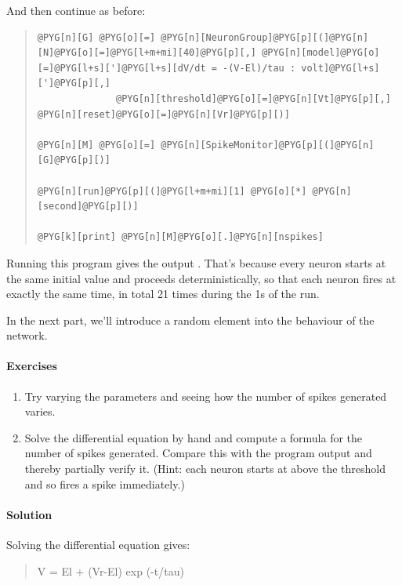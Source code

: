 \documentclass[letterpaper,10pt,english]{manual}
\begin{document}
And then continue as before:
\begin{quote}

\begin{Verbatim}[commandchars=@\[\]]
@PYG[n][G] @PYG[o][=] @PYG[n][NeuronGroup]@PYG[p][(]@PYG[n][N]@PYG[o][=]@PYG[l+m+mi][40]@PYG[p][,] @PYG[n][model]@PYG[o][=]@PYG[l+s][']@PYG[l+s][dV/dt = -(V-El)/tau : volt]@PYG[l+s][']@PYG[p][,]
              @PYG[n][threshold]@PYG[o][=]@PYG[n][Vt]@PYG[p][,] @PYG[n][reset]@PYG[o][=]@PYG[n][Vr]@PYG[p][)]

@PYG[n][M] @PYG[o][=] @PYG[n][SpikeMonitor]@PYG[p][(]@PYG[n][G]@PYG[p][)]

@PYG[n][run]@PYG[p][(]@PYG[l+m+mi][1] @PYG[o][*] @PYG[n][second]@PYG[p][)]

@PYG[k][print] @PYG[n][M]@PYG[o][.]@PYG[n][nspikes]
\end{Verbatim}
\end{quote}

Running this program gives the output . That's because
every neuron starts at the same initial value and proceeds
deterministically, so that each neuron fires at exactly the
same time, in total 21 times during the 1s of the run.

In the next part, we'll introduce a random element into the
behaviour of the network.


\paragraph{Exercises}
\begin{enumerate}
\item {} 
Try varying the parameters and seeing how the number of
spikes generated varies.

\item {} 
Solve the differential equation by hand and compute a
formula for the number of spikes generated. Compare this
with the program output and thereby partially verify it.
(Hint: each neuron starts at above the threshold and so
fires a spike immediately.)

\end{enumerate}


\paragraph{Solution}

Solving the differential equation gives:
\begin{quote}

V = El + (Vr-El) exp (-t/tau)
\end{quote}
\end{document}
